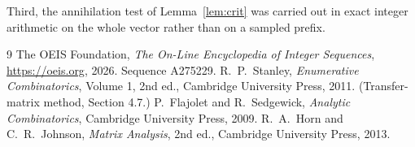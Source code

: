 \documentclass[11pt,a4paper]{article}
\theoremstyle{plain}
\theoremstyle{definition}
\begin{document}
Third, the annihilation test of Lemma~\ref{lem:crit} was carried out in exact integer
arithmetic on the whole vector rather than on a sampled prefix.

\begin{thebibliography}{9}
 The OEIS Foundation, \emph{The On-Line Encyclopedia of Integer
Sequences}, \url{https://oeis.org}, 2026. Sequence A275229.
 R.~P.~Stanley, \emph{Enumerative Combinatorics}, Volume 1, 2nd ed.,
Cambridge University Press, 2011. (Transfer-matrix method, Section 4.7.)
 P.~Flajolet and R.~Sedgewick, \emph{Analytic Combinatorics}, Cambridge
University Press, 2009.
 R.~A.~Horn and C.~R.~Johnson, \emph{Matrix Analysis}, 2nd ed., Cambridge
University Press, 2013.
\end{thebibliography}
\end{document}
